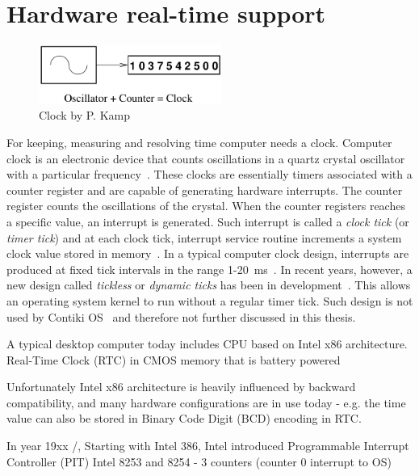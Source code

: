 
\chapter{Hardware real-time support}
\begin{figure}
	\centering
	\includegraphics[width=6cm,keepaspectratio]{fig/clock.png}
	\caption{Clock by P. Kamp}
	\label{fig:hw-clock}
\end{figure}
For keeping, measuring and resolving time computer needs a clock.
Computer clock is an electronic device that counts oscillations in a
quartz crystal oscillator with a particular frequency~\cite{thesis-sync}.
These clocks are essentially timers associated with a counter register and
are capable of generating hardware interrupts.
The counter register counts the oscillations of the crystal.
When the counter registers reaches a specific value,
an interrupt is generated.
Such interrupt is called a {\it{clock tick}} (or {\it{timer tick}}) and at each clock tick,
interrupt service routine increments a system clock value stored in memory~\cite{thesis-sync}.
In a typical computer clock design, interrupts are produced at
fixed tick intervals in the range 1-20~ms~\cite{nanokernel}.
In recent years, however, a new design called {\it{tickless}} or {\it{dynamic ticks}}
has been in development~\cite{kernel-timer-systems}.
This allows an operating system kernel to run without a regular timer tick.
Such design is not used by Contiki OS~\cite{contiki-docs} and
therefore not further discussed in this thesis.


A typical desktop computer today includes CPU based on Intel x86 architecture.
Real-Time Clock (RTC) in CMOS memory that is battery powered

Unfortunately Intel x86 architecture is heavily influenced by backward compatibility,
and many hardware configurations are in use today -
e.g. the time value can also be stored in Binary Code Digit (BCD) encoding in RTC.

In year 19xx /, Starting with Intel 386,
Intel introduced
Programmable Interrupt Controller (PIT) Intel 8253 and 8254 - 3 counters (counter 0 interrupt to OS)

